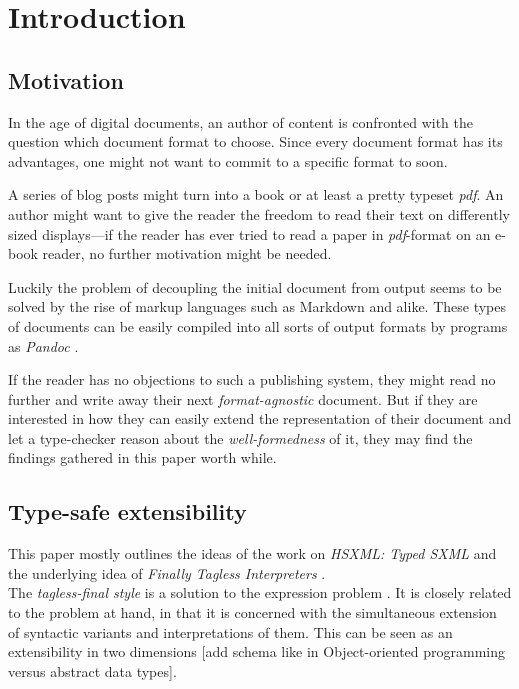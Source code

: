 \section{Introduction}

\subsection{Motivation}

In the age of digital documents, an author of content is confronted with the
question which document format to choose. Since every document format has its
advantages, one might not want to commit to a specific format to soon.

A series of blog posts might turn into a book or at least a pretty typeset
\emph{pdf}. An author might want to give the reader the freedom to read their
text on differently sized displays—if the reader has ever tried to read a paper
in \emph{pdf}-format on an e-book reader, no further motivation might be needed.

Luckily the problem of decoupling the initial document from output seems to be
solved by the rise of markup languages such as Markdown and alike. These types
of documents can be easily compiled into all sorts of output formats by programs
as \emph{Pandoc} \cite{pandoc}.

If the reader has no objections to such a publishing system, they might read no
further and write away their next \emph{format-agnostic} document. But if they
are interested in how they can easily extend the representation of their
document and let a type-checker reason about the \emph{well-formedness} of it,
they may find the findings gathered in this paper worth while.

\subsection{Type-safe extensibility}

This paper mostly outlines the ideas of the work on \emph{HSXML: Typed SXML}
\cite{hsxml} and the underlying idea of \emph{Finally Tagless Interpreters}
\cite{finally-tagless, finally-tagless-tut}.\\
The \emph{tagless-final style} is a solution to the expression problem
\cite{expression-problem}. It is closely related to the problem at hand, in that
it is concerned with the simultaneous extension of syntactic variants and
interpretations of them. This can be seen as an extensibility in two dimensions
[add schema like in Object-oriented programming versus abstract data types].

